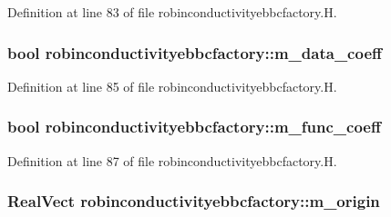 Definition at line 83 of file robinconductivityebbcfactory.\+H.

\subsubsection[{\texorpdfstring{m\+\_\+data\+\_\+coeff}{m_data_coeff}}]{\setlength{\rightskip}{0pt plus 5cm}bool robinconductivityebbcfactory\+::m\+\_\+data\+\_\+coeff\hspace{0.3cm}{\ttfamily [protected]}}\hypertarget{classrobinconductivityebbcfactory_ad83f951b9867ad280be2dd2fc2e834a3}{}\label{classrobinconductivityebbcfactory_ad83f951b9867ad280be2dd2fc2e834a3}


Definition at line 85 of file robinconductivityebbcfactory.\+H.

\subsubsection[{\texorpdfstring{m\+\_\+func\+\_\+coeff}{m_func_coeff}}]{\setlength{\rightskip}{0pt plus 5cm}bool robinconductivityebbcfactory\+::m\+\_\+func\+\_\+coeff\hspace{0.3cm}{\ttfamily [protected]}}\hypertarget{classrobinconductivityebbcfactory_a98069b7633cc317b2dcd1a7dfebd344e}{}\label{classrobinconductivityebbcfactory_a98069b7633cc317b2dcd1a7dfebd344e}


Definition at line 87 of file robinconductivityebbcfactory.\+H.

\subsubsection[{\texorpdfstring{m\+\_\+origin}{m_origin}}]{\setlength{\rightskip}{0pt plus 5cm}Real\+Vect robinconductivityebbcfactory\+::m\+\_\+origin\hspace{0.3cm}{\ttfamily [protected]}}\hypertarget{classrobinconductivityebbcfactory_a27b41e2e6403d51fcecd5164cf116b51}{}\label{classrobinconductivityebbcfactory_a27b41e2e6403d51fcecd5164cf116b51}


